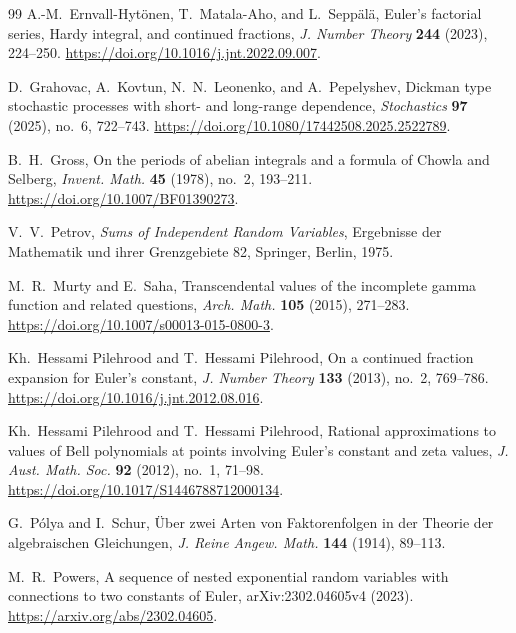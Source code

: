 \begin{thebibliography}{99}
A.-M.~Ernvall-Hyt\"onen, T.~Matala-Aho, and L.~Sepp\"al\"a,
\newblock Euler's factorial series, Hardy integral, and continued fractions,
\newblock \emph{J. Number Theory} \textbf{244} (2023), 224--250.
\newblock \url{https://doi.org/10.1016/j.jnt.2022.09.007}.

D.~Grahovac, A.~Kovtun, N.~N.~Leonenko, and A.~Pepelyshev,
\newblock Dickman type stochastic processes with short- and long-range
dependence,
\newblock \emph{Stochastics} \textbf{97} (2025), no.~6, 722--743.
\newblock \url{https://doi.org/10.1080/17442508.2025.2522789}.

B.~H.~Gross,
\newblock On the periods of abelian integrals and a formula of Chowla and
Selberg,
\newblock \emph{Invent. Math.} \textbf{45} (1978), no.~2, 193--211.
\newblock \url{https://doi.org/10.1007/BF01390273}.

V.~V.~Petrov,
\newblock \emph{Sums of Independent Random Variables},
\newblock Ergebnisse der Mathematik und ihrer Grenzgebiete 82,
Springer, Berlin, 1975.

M.~R.~Murty and E.~Saha,
\newblock Transcendental values of the incomplete gamma function and
related questions,
\newblock \emph{Arch. Math.} \textbf{105} (2015), 271--283.
\newblock \url{https://doi.org/10.1007/s00013-015-0800-3}.

Kh.~Hessami Pilehrood and T.~Hessami Pilehrood,
\newblock On a continued fraction expansion for Euler's constant,
\newblock \emph{J. Number Theory} \textbf{133} (2013), no.~2, 769--786.
\newblock \url{https://doi.org/10.1016/j.jnt.2012.08.016}.

Kh.~Hessami Pilehrood and T.~Hessami Pilehrood,
\newblock Rational approximations to values of Bell polynomials at points
involving Euler's constant and zeta values,
\newblock \emph{J. Aust. Math. Soc.} \textbf{92} (2012), no.~1, 71--98.
\newblock \url{https://doi.org/10.1017/S1446788712000134}.

G.~P\'olya and I.~Schur,
\newblock \"Uber zwei Arten von Faktorenfolgen in der Theorie der
algebraischen Gleichungen,
\newblock \emph{J. Reine Angew. Math.} \textbf{144} (1914), 89--113.

M.~R.~Powers,
\newblock A sequence of nested exponential random variables with connections
to two constants of Euler,
\newblock arXiv:2302.04605v4 (2023).
\newblock \url{https://arxiv.org/abs/2302.04605}.


\end{thebibliography}
